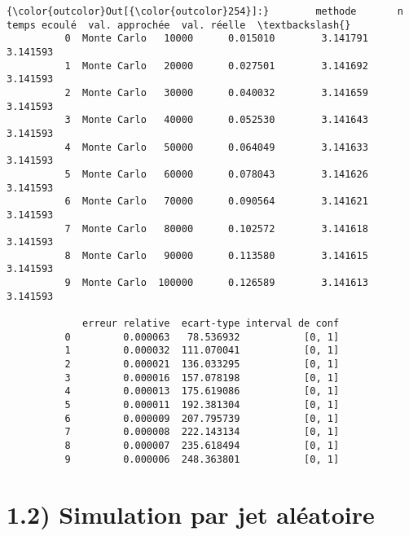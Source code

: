 \documentclass[11pt]{article}
\begin{document}
            \begin{Verbatim}[commandchars=\\\{\}]
{\color{outcolor}Out[{\color{outcolor}254}]:}        methode       n  temps ecoulé  val. approchée  val. réelle  \textbackslash{}
          0  Monte Carlo   10000      0.015010        3.141791     3.141593   
          1  Monte Carlo   20000      0.027501        3.141692     3.141593   
          2  Monte Carlo   30000      0.040032        3.141659     3.141593   
          3  Monte Carlo   40000      0.052530        3.141643     3.141593   
          4  Monte Carlo   50000      0.064049        3.141633     3.141593   
          5  Monte Carlo   60000      0.078043        3.141626     3.141593   
          6  Monte Carlo   70000      0.090564        3.141621     3.141593   
          7  Monte Carlo   80000      0.102572        3.141618     3.141593   
          8  Monte Carlo   90000      0.113580        3.141615     3.141593   
          9  Monte Carlo  100000      0.126589        3.141613     3.141593   
          
             erreur relative  ecart-type interval de conf  
          0         0.000063   78.536932           [0, 1]  
          1         0.000032  111.070041           [0, 1]  
          2         0.000021  136.033295           [0, 1]  
          3         0.000016  157.078198           [0, 1]  
          4         0.000013  175.619086           [0, 1]  
          5         0.000011  192.381304           [0, 1]  
          6         0.000009  207.795739           [0, 1]  
          7         0.000008  222.143134           [0, 1]  
          8         0.000007  235.618494           [0, 1]  
          9         0.000006  248.363801           [0, 1]  
\end{Verbatim}
        
    \section{1.2) Simulation par jet
aléatoire}\label{simulation-par-jet-aluxe9atoire}
\end{document}
